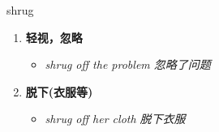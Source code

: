 
\begin{frame}
{\huge shrug}
\begin{center}
\begin{enumerate}\Large
  \item \textbf{轻视，忽略}
  \begin{itemize}
    \item \em{\Large{shrug off the problem 忽略了问题}}
  \end{itemize}
  \item \textbf{脱下(衣服等)}
  \begin{itemize}
    \item \em{\Large{shrug off her cloth 脱下衣服}}
  \end{itemize}
\end{enumerate}
\end{center}
\end{frame}
